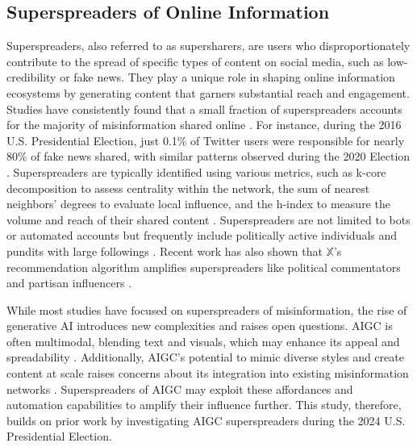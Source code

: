 \subsection{Superspreaders of Online Information}
Superspreaders, also referred to as supersharers, are users who disproportionately contribute to the spread of specific types of content on social media, such as low-credibility or fake news. They play a unique role in shaping online information ecosystems by generating content that garners substantial reach and engagement. Studies have consistently found that a small fraction of superspreaders accounts for the majority of misinformation shared online \cite{nogara2022disinformation,deverna2024identifying}. For instance, during the 2016 U.S. Presidential Election, just 0.1\% of Twitter users were responsible for nearly 80\% of fake news shared, with similar patterns observed during the 2020 Election \cite{grinberg2019fake, baribi2024supersharers, guess2018selective}.  Superspreaders are typically identified using various metrics, such as k-core decomposition to assess centrality within the network, the sum of nearest neighbors' degrees to evaluate local influence, and the h-index to measure the volume and reach of their shared content \cite{pei2014searching, deverna2024identifying}. Superspreaders are not limited to bots or automated accounts but frequently include politically active individuals and pundits with large followings \cite{guess2019less, baribi2024supersharers}. Recent work has also shown that $\mathbb{X}$'s recommendation algorithm amplifies superspreaders like political commentators and partisan influencers \cite{ye2024auditing}. 

While most studies have focused on superspreaders of misinformation, the rise of generative AI introduces new complexities and raises open questions. AIGC is often multimodal, blending text and visuals, which may enhance its appeal and spreadability \cite{cao2023comprehensive}. Additionally, AIGC's potential to mimic diverse styles and create content at scale raises concerns about its integration into existing misinformation networks \cite{ferrara2024genai}. Superspreaders of AIGC may exploit these affordances and automation capabilities to amplify their influence further. This study, therefore, builds on prior work by investigating AIGC superspreaders during the 2024 U.S. Presidential Election.